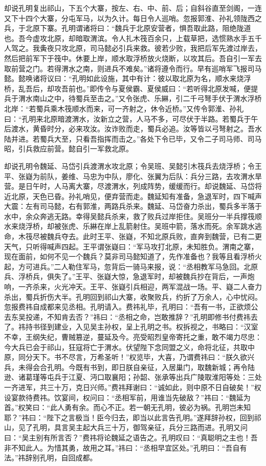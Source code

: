 却说孔明复出祁山，下五个大寨，按左、右、中、前、后；自斜谷直至剑阁，一连又下十四个大寨，分屯军马，以为久计。每日令人巡哨。忽报郭淮、孙礼领陇西之兵，于北原下寨。孔明谓诸将曰：“魏兵于北原安营者，惧吾取此路，阻绝陇道也。吾今虚攻北原，却暗取渭滨。令人扎木筏百余只，上载草把，选惯熟水手五千人驾之。我夤夜只攻北原，司马懿必引兵来救。彼若少败，我把后军先渡过岸去，然后把前军下于筏中。休要上岸，顺水取浮桥放火烧断，以攻其后。吾自引一军去取前营之门。若得渭水之南，则进兵不难矣。”诸将遵令而行。早有巡哨军飞报司马懿。懿唤诸将议曰：“孔明如此设施，其中有计：彼以取北原为名，顺水来烧浮桥，乱吾后，却攻吾前也。”即传令与夏侯霸、夏侯威曰：“若听得北原发喊，便提兵于渭水南山之中，待蜀兵至击之。”又令张虎、乐綝，引二千弓弩手伏于渭水浮桥北岸：“若蜀兵乘木筏顺水而来，可一齐射之，休令近桥。”又传令郭淮、孙礼曰：“孔明来北原暗渡渭水，汝新立之营，人马不多，可尽伏于半路。若蜀兵于午后渡水，黄昏时分，必来攻汝。汝诈败而走，蜀兵必追。汝等皆以弓弩射之。吾水陆并进。若蜀兵大至，只看吾指挥而击之。”各处下令已毕，又令二子司马师、司马昭，引兵救应前营。懿自引一军救北原。

却说孔明令魏延、马岱引兵渡渭水攻北原；令吴班、吴懿引木筏兵去烧浮桥；令王平、张嶷为前队，姜维、马忠为中队，廖化、张翼为后队：兵分三路，去攻渭水旱营。是日午时，人马离大寨，尽渡渭水，列成阵势，缓缓而行。却说魏延、马岱将近北原，天色已昏。孙礼哨见，便弃营而走。魏延知有准备，急退军时，四下喊声大震：左有司马懿，右有郭淮，两路兵杀来。魏延、马岱奋力杀出，蜀兵多半落于水中，余众奔逃无路。幸得吴懿兵杀来，救了败兵过岸拒住。吴班分一半兵撑筏顺水来烧浮桥，却被张虎、乐綝在岸上乱箭射住。吴班中箭，落水而死。余军跳水逃命，木筏尽被魏兵夺去。此时王平、张嶷，不知北原兵败，直奔到魏营，已有二更天气，只听得喊声四起。王平谓张嶷曰：“军马攻打北原，未知胜负。渭南之寨，现在面前，如何不见一个魏兵？莫非司马懿知道了，先作准备也？我等且看浮桥火起，方可进兵。”二人勒住军马，忽背后一骑马来报，说：“丞相教军马急回。北原兵、浮桥兵，俱失了。”王平、张嶷大惊，急退军时，却被魏兵抄在背后，一声炮响，一齐杀来，火光冲天。王平、张嶷引兵相迎，两军混战一场。平、嶷二人奋力杀出，蜀兵折伤大半。孔明回到祁山大寨，收聚败兵，约折了万余人，心中忧闷。忽报费祎自成都来见丞相。孔明请入。费祎礼毕，孔明曰：“吾有一书，正欲烦公去东吴投递，不知肯去否？”祎曰：“丞相之命，岂敢推辞？”孔明即修书付费祎去了。祎持书径到建业，入见吴主孙权，呈上孔明之书。权拆视之，书略曰：“汉室不幸，王纲失纪，曹贼篡逆，蔓延及今。亮受昭烈皇帝寄托之重，敢不竭力尽忠：今大兵已会于祁山，狂寇将亡于渭水。伏望陛下念同盟之义，命将北征，共取中原，同分天下。书不尽言，万希圣听！”权览毕，大喜，乃谓费祎曰：“朕久欲兴兵，未得会合孔明。今既有书到，即日朕自亲征，入居巢门，取魏新城；再令陆逊、诸葛瑾等屯兵于江夏、沔口取襄阳；孙韶、张承等出兵广陵取淮阳等处：三处一齐进军，共三十万，克日兴师。”费祎拜谢曰：“诚如此，则中原不日自破矣！”权设宴款待费祎。饮宴间，权问曰：“丞相军前，用谁当先破敌？”祎曰：“魏延为首。”权笑曰：“此人勇有余。而心不正。若一朝无孔明，彼必为祸。孔明岂未知耶？”祎曰：“陛下之言极当！臣今归去，即当以此言告孔明。”遂拜辞孙权，回到祁山，见了孔明，具言吴主起大兵三十万，御驾亲征，兵分三路而进。孔明又问曰：“吴主别有所言否？”费祎将论魏延之语告之。孔明叹曰：“真聪明之主也！吾非不知此人。为惜其勇，故用之耳。”祎曰：“丞相早宜区处。”孔明曰：“吾自有法。”祎辞别孔明，自回成都。

